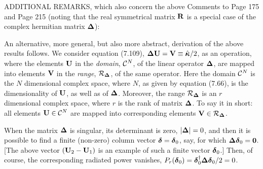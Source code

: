 \documentclass[a4paper,12pt]{article}
\newcommand{\bdelta}{\mbox{\boldmath ${\rm \delta}$}}
\newcommand{\bkappa}{\mbox{\boldmath $\rm \kappa$}}
\begin{document}
\noindent
ADDITIONAL REMARKS, which also concern the above Comments to \linebreak Page 175 and Page 215 (noting that the real symmetrical matrix $\bf R$ is a special case of the complex hermitian matrix $\bf \Delta$):

\vspace{0.2cm}
\noindent
An alternative, more general, but also more abstract, derivation of the above results follows. We consider equation (7.109), ${\bf \Delta}{\bf U}= {\bf V} \equiv \hat{\bkappa}/2$, as an operation, where the elements ${\bf U}$ in the {\it domain}, ${\cal C}^{N}$, of the linear operator ${\bf \Delta}$,  are mapped into elements ${\bf V}$ in the {\it range}, ${\cal R}_{{\bf \Delta}}$, of the same operator. Here the domain ${\cal C}^{N}$ is the $N$ dimensional complex space, where $N$, as given by equation (7.66), is the dimensionality of ${\bf U}$, as well as of ${\bf \Delta}$. Moreover, the range ${\cal R}_{{\bf \Delta}}$ is an $r$ dimensional complex space, where $r$ is the rank of matrix ${\bf \Delta}$. To say it in short: all elements ${\bf U} \in {\cal C}^{N}$ are mapped into corresponding elements ${\bf V} \in {\cal R}_{\bf \Delta}$.

When the matrix $\bf \Delta$ is singular, its determinant is zero, $|{\bf \Delta}| = 0$, and then it is possible to find a finite (non-zero) column vector $\bdelta = \bdelta_0$, say, for which ${\bf \Delta} \bdelta_0 = \bf 0$. [The above vector $({\bf U}_2 - {\bf U}_1)$ is an example of such a finite vector $\bdelta_0$.] Then, of course, the corresponding radiated power vanishes, \linebreak
$P_r(\bdelta_0) = {\bdelta_0^{\dagger}}{\bf \Delta} \bdelta_0/2 = 0$.
\end{document}
